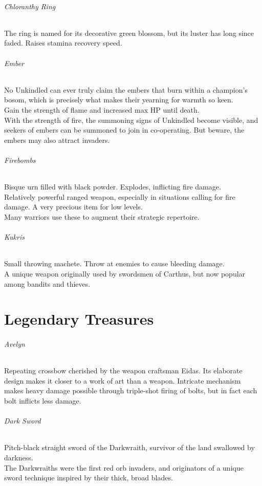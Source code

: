 \documentclass[twocolumn,a4paper]{article}
\begin{document}
\paragraph{Chloranthy Ring}
The ring is named for its decorative green blossom, but its luster has long since faded. Raises stamina recovery speed.
\paragraph{Ember}
No Unkindled can ever truly claim the embers that burn within a champion's bosom, which is precisely what makes their yearning for warmth so keen.\\
Gain the strength of flame and increased max HP until death.\\
With the strength of fire, the summoning signs of Unkindled become visible, and seekers of embers can be summoned to join in co-operating. But beware, the embers may also attract invaders.
\paragraph{Firebombs}
Bisque urn filled with black powder. Explodes, inflicting fire damage.\\
Relatively powerful ranged weapon, especially in situations calling for fire damage. A very precious item for low levels.\\
Many warriors use these to augment their strategic repertoire.
\paragraph{Kukris}
Small throwing machete. Throw at enemies to cause bleeding damage.\\
A unique weapon originally used by swordsmen of Carthus, but now popular among bandits and thieves.

\part{Legendary Treasures}
\paragraph{Avelyn}
Repeating crossbow cherished by the weapon craftsman Eidas. Its elaborate design makes it closer to a work of art than a weapon. Intricate mechanism makes heavy damage possible through triple-shot firing of bolts, but in fact each bolt inflicts less damage.
\paragraph{Dark Sword}
Pitch-black straight sword of the Darkwraith, survivor of the land swallowed by darkness.\\
The Darkwraiths were the first red orb invaders, and originators of a unique sword technique inspired by their thick, broad blades.
\end{document}
